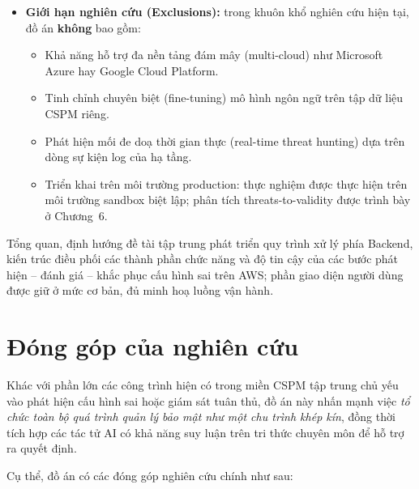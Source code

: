 \begin{itemize}
    \item \textbf{Giới hạn nghiên cứu (Exclusions):} trong khuôn khổ nghiên cứu hiện tại, đồ án \textbf{không} bao gồm:
    \begin{itemize}
        \item Khả năng hỗ trợ đa nền tảng đám mây (multi-cloud) như Microsoft Azure hay Google Cloud Platform.
        \item Tinh chỉnh chuyên biệt (fine-tuning) mô hình ngôn ngữ trên tập dữ liệu CSPM riêng.
        \item Phát hiện mối đe doạ thời gian thực (real-time threat hunting) dựa trên dòng sự kiện log của hạ tầng.
        \item Triển khai trên môi trường production: thực nghiệm được thực hiện trên môi trường sandbox biệt lập; phân tích threats-to-validity được trình bày ở Chương~6.
    \end{itemize}
\end{itemize}

Tổng quan, định hướng đề tài tập trung phát triển quy trình xử lý phía Backend, kiến trúc điều phối các thành phần chức năng và độ tin cậy của các bước phát hiện – đánh giá – khắc phục cấu hình sai trên AWS; phần giao diện người dùng được giữ ở mức cơ bản, đủ minh hoạ luồng vận hành.


\section{Đóng góp của nghiên cứu}
\label{sec:contributions}

Khác với phần lớn các công trình hiện có trong miền CSPM tập trung chủ yếu vào phát hiện cấu hình sai hoặc giám sát tuân thủ, đồ án này nhấn mạnh việc \textit{tổ chức toàn bộ quá trình quản lý bảo mật như một chu trình khép kín}, đồng thời tích hợp các tác tử AI có khả năng suy luận trên tri thức chuyên môn để hỗ trợ ra quyết định.

Cụ thể, đồ án có các đóng góp nghiên cứu chính như sau:


